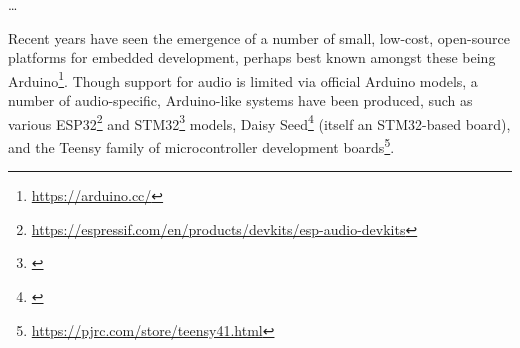 \dots

Recent years have seen the emergence of a number of small, low-cost, open-source
platforms for embedded development, perhaps best known amongst these being
Arduino\footnote{\url{https://arduino.cc/}}.
Though support for audio is limited via official Arduino models, a number of
audio-specific, Arduino-like systems have been produced, such as various
ESP32\footnote{\url{https://espressif.com/en/products/devkits/esp-audio-devkits}}
and STM32\footnote{\url{}} models, Daisy Seed\footnote{\url{}} (itself an STM32-based board), and the Teensy family of microcontroller
development boards\footnote{\url{https://pjrc.com/store/teensy41.html}}.
